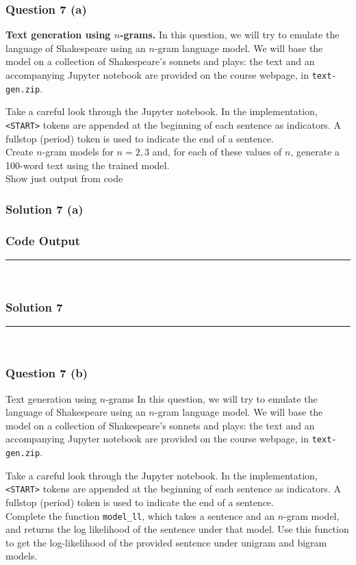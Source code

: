 \documentclass{article}
\begin{document}
\subsubsection*{Question 7 (a)}
\begin{flushleft}
 \textbf{Text generation using $n$-grams.} In this question, we will try to emulate the language of Shakespeare using an $n$-gram language model. We will base the model on a collection of Shakespeare's sonnets and plays: the text and an accompanying Jupyter notebook are provided on the course webpage, in \texttt{text-gen.zip}.

Take a careful look through the Jupyter notebook. In the implementation, \texttt{<START>} tokens are appended at the beginning of each sentence as indicators. A fullstop (period) token is used to indicate the end of a sentence.\\
Create $n$-gram models for $n=2, 3$ and, for each of these values of $n$, generate a 100-word text using the trained model. \\
Show just output from code
\end{flushleft}

\subsubsection*{Solution 7 (a)}
\subsubsection*{Code Output}


\noindent\rule{\textwidth}{0.4pt}\\

\newpage

\subsubsection*{Solution 7}
\noindent\rule{\textwidth}{0.4pt}\\
\subsubsection*{Question 7 (b)}
\begin{flushleft}
Text generation using $n$-grams In this question, we will try to emulate the language of Shakespeare using an $n$-gram language model. We will base the model on a collection of Shakespeare's sonnets and plays: the text and an accompanying Jupyter notebook are provided on the course webpage, in \texttt{text-gen.zip}.

Take a careful look through the Jupyter notebook. In the implementation, \texttt{<START>} tokens are appended at the beginning of each sentence as indicators. A fullstop (period) token is used to indicate the end of a sentence.\\
Complete the function \texttt{model\_ll}, which takes a sentence and an $n$-gram model, and returns the log likelihood of the sentence under that model. Use this function to get the log-likelihood of the provided sentence under unigram and bigram models.\\
\end{flushleft}
\end{document}
